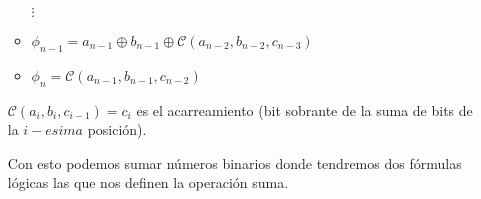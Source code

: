 \documentclass[10pt]{article}
\begin{document}
\begin{enumerate}
\begin{itemize}
        \hspace{0.55cm}$\vdots$

        \item $\phi_{n-1}=a_{n-1}\oplus b_{n-1}\oplus\mathcal{C}(a_{n-2},b_{n-2},c_{n-3})$
        \item $\phi_n=\mathcal{C}(a_{n-1},b_{n-1},c_{n-2})$
    \end{itemize}

    $\mathcal{C}(a_i,b_i,c_{i-1})=c_i$ es el acarreamiento (bit sobrante de la suma de bits de la $i-esima$ posición).
        
    Con esto podemos sumar números binarios donde tendremos dos fórmulas lógicas las que nos definen la operación suma.
    
    \end{enumerate}
\end{document}
